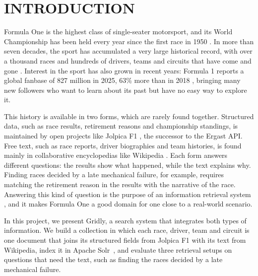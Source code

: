 \documentclass[sigconf]{acmart}
\begin{document}


\maketitle


\section{INTRODUCTION}
Formula One is the highest class of single-seater motorsport, and its
World Championship has been held every year since the first race in 1950
\cite{f1history}. In more than seven decades, the sport has accumulated
a very large historical record, with over a thousand races and hundreds
of drivers, teams and circuits that have come and gone \cite{jolpica}.
Interest in the sport has also grown in recent years: Formula 1 reports
a global fanbase of 827 million in 2025, 63\% more than in 2018
\cite{f1fans}, bringing many new followers who want to learn about its
past but have no easy way to explore it.

This history is available in two forms, which are rarely found together.
Structured data, such as race results, retirement reasons and
championship standings, is maintained by open projects like Jolpica F1
\cite{jolpica}, the successor to the Ergast API. Free text, such as race
reports, driver biographies and team histories, is found mainly in
collaborative encyclopedias like Wikipedia \cite{wikipedia}. Each form
answers different questions: the results show what happened, while the
text explains why. Finding races decided by a late mechanical failure,
for example, requires matching the retirement reason in the results with
the narrative of the race. Answering this kind of question is the
purpose of an information retrieval system \cite{manning2008}, and it
makes Formula One a good domain for one close to a real-world scenario.

In this project, we present Gridly, a search system that integrates both
types of information. We build a collection in which each race, driver,
team and circuit is one document that joins its structured fields from
Jolpica F1 with its text from Wikipedia, index it in Apache
Solr~\cite{solr}, and evaluate three retrieval setups on questions that need
the text, such as finding the races decided by a late mechanical failure.
\end{document}
